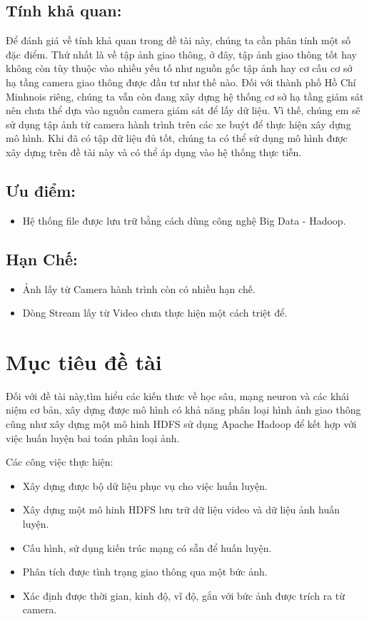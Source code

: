\subsection{Tính khả quan:}
Để đánh giá về tính khả quan trong đề tài này, chúng ta cần phân tính một số đặc điểm. Thứ nhất là về tập ảnh giao thông, ở đây, tập ảnh giao thông tốt hay không còn tùy thuộc vào nhiều yếu tố như nguồn gốc tập ảnh hay cơ cấu cơ sở hạ tầng camera giao thông được đầu tư như thế nào. Đối với thành phố Hồ Chí Minhnois riêng, chúng ta vẫn còn đang xây dựng hệ thống cơ sở hạ tầng giám sát nên chưa thể dựa vào nguồn camera giám sát để lấy dữ liệu. Vì thế, chúng em sẽ sử dụng tập ảnh từ camera hành trình trên các xe buýt để thực hiện xây dựng mô hình. Khi đã có tập dữ liệu đủ tốt, chúng ta có thể sử dụng mô hình được xây dựng trên đề tài này và có thể áp dụng vào hệ thống thực tiễn.
\subsection{Ưu điểm:}
\begin{itemize}
\item Hệ thống file được lưu trữ bằng cách dùng công nghệ Big Data - Hadoop.
\end{itemize}
\subsection{Hạn Chế:}
\begin{itemize}
\item Ảnh lấy từ Camera hành trình còn có nhiều hạn chế.
\item Dòng Stream lấy từ Video chưa thực hiện một cách triệt để.
\end{itemize}
\section{Mục tiêu đề tài}
Đối với đề tài này,tìm hiểu các kiến thưc về học sâu, mạng neuron và các khái niệm cơ bản, xây dựng được mô hình có khả năng phân loại hình ảnh giao thông cũng như xây dựng một mô hinh HDFS sử dụng Apache Hadoop để kết hợp với việc huấn luyện bai toán phân loại ảnh.\par
Các công việc thực hiện:
\begin{itemize}
	\item Xây dựng được bộ dữ liệu phục vụ cho việc huấn luyện.
	\item Xây dựng một mô hinh HDFS lưu trữ dữ liệu video và dữ liệu ảnh huấn luyện.
	\item Cấu hình, sử dụng kiến trúc mạng có sẵn để huấn luyện.
	\item Phân tích được tình trạng giao thông qua một bức ảnh.
	\item Xác định được thời gian, kinh độ, vĩ độ, gắn với bức ảnh được trích ra từ camera.	
\end{itemize}